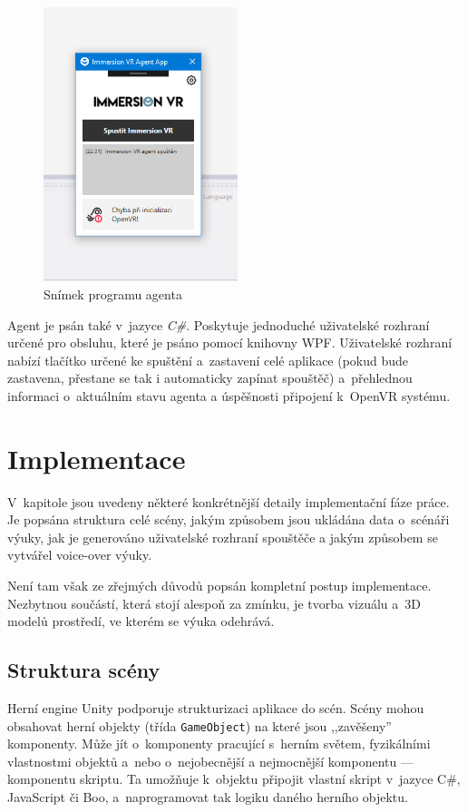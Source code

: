 \begin{figure}[h!]
\centering
\includegraphics[height=8cm]{src/assets/agent-screen.png}
\caption{Snímek programu agenta}
\end{figure}

Agent je psán také v~jazyce \emph{C\#}. Poskytuje jednoduché uživatelské
rozhraní určené pro obsluhu, které je psáno pomocí knihovny WPF.
Uživatelské rozhraní nabízí tlačítko určené ke spuštění a~zastavení celé
aplikace (pokud bude zastavena, přestane se tak i automaticky zapínat
spouštěč) a~přehlednou informaci o~aktuálním stavu agenta a úspěšnosti
připojení k~OpenVR systému.

\section{Implementace}\label{implementace}

V~kapitole jsou uvedeny některé konkrétnější detaily implementační fáze
práce. Je popsána struktura celé scény, jakým způsobem jsou ukládána
data o~scénáři výuky, jak je generováno uživatelské rozhraní spouštěče a
jakým způsobem se vytvářel voice-over výuky.

Není tam však ze zřejmých důvodů popsán kompletní postup
implementace. Nezbytnou součástí, která stojí alespoň za zmínku, je
tvorba vizuálu a~3D modelů prostředí, ve kterém se výuka odehrává.

\subsection{Struktura scény}\label{struktura-scuxe9ny}

Herní engine Unity podporuje strukturizaci aplikace do scén. Scény mohou
obsahovat herní objekty (třída \texttt{GameObject}) na které jsou
,,zavěšeny'' komponenty. \autocite{unityscenes} Může jít o~komponenty pracující s~herním
světem, fyzikálními vlastnostmi objektů a~nebo o~nejobecnější a
nejmocnější komponentu --- komponentu skriptu. Ta umožňuje k~objektu
připojit vlastní skript v~jazyce C\#, JavaScript či Boo, a~naprogramovat
tak logiku daného herního objektu.

